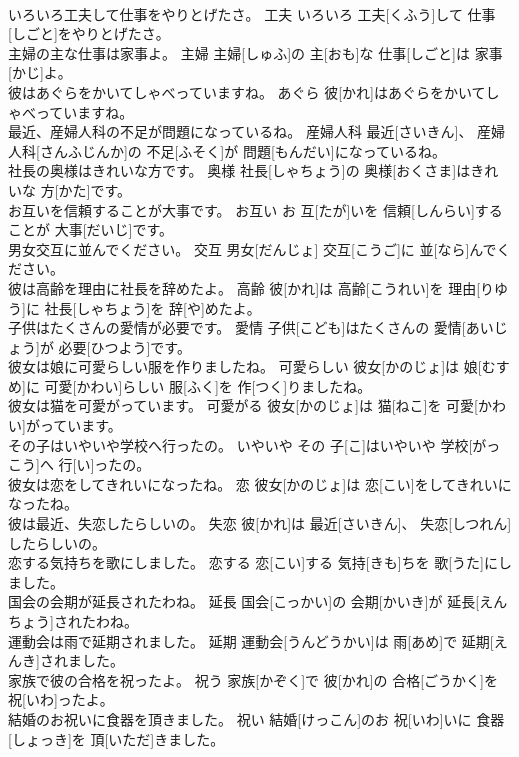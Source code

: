 \documentclass[8pt]{extreport}
\begin{document}
\begin{CJK}{UTF8}{min}
\\	いろいろ工夫して仕事をやりとげたさ。	工夫	いろいろ 工夫[くふう]して 仕事[しごと]をやりとげたさ。	
\\	主婦の主な仕事は家事よ。	主婦	主婦[しゅふ]の 主[おも]な 仕事[しごと]は 家事[かじ]よ。	
\\	彼はあぐらをかいてしゃべっていますね。	あぐら	彼[かれ]はあぐらをかいてしゃべっていますね。	
\\	最近、産婦人科の不足が問題になっているね。	産婦人科	最近[さいきん]、 産婦人科[さんふじんか]の 不足[ふそく]が 問題[もんだい]になっているね。	
\\	社長の奥様はきれいな方です。	奥様	社長[しゃちょう]の 奥様[おくさま]はきれいな 方[かた]です。	
\\	お互いを信頼することが大事です。	お互い	お 互[たが]いを 信頼[しんらい]することが 大事[だいじ]です。	
\\	男女交互に並んでください。	交互	男女[だんじょ] 交互[こうご]に 並[なら]んでください。	
\\	彼は高齢を理由に社長を辞めたよ。	高齢	彼[かれ]は 高齢[こうれい]を 理由[りゆう]に 社長[しゃちょう]を 辞[や]めたよ。	
\\	子供はたくさんの愛情が必要です。	愛情	子供[こども]はたくさんの 愛情[あいじょう]が 必要[ひつよう]です。	
\\	彼女は娘に可愛らしい服を作りましたね。	可愛らしい	彼女[かのじょ]は 娘[むすめ]に 可愛[かわい]らしい 服[ふく]を 作[つく]りましたね。	
\\	彼女は猫を可愛がっています。	可愛がる	彼女[かのじょ]は 猫[ねこ]を 可愛[かわい]がっています。	
\\	その子はいやいや学校へ行ったの。	いやいや	その 子[こ]はいやいや 学校[がっこう]へ 行[い]ったの。	
\\	彼女は恋をしてきれいになったね。	恋	彼女[かのじょ]は 恋[こい]をしてきれいになったね。	
\\	彼は最近、失恋したらしいの。	失恋	彼[かれ]は 最近[さいきん]、 失恋[しつれん]したらしいの。	
\\	恋する気持ちを歌にしました。	恋する	恋[こい]する 気持[きも]ちを 歌[うた]にしました。	
\\	国会の会期が延長されたわね。	延長	国会[こっかい]の 会期[かいき]が 延長[えんちょう]されたわね。	
\\	運動会は雨で延期されました。	延期	運動会[うんどうかい]は 雨[あめ]で 延期[えんき]されました。	
\\	家族で彼の合格を祝ったよ。	祝う	家族[かぞく]で 彼[かれ]の 合格[ごうかく]を 祝[いわ]ったよ。	
\\	結婚のお祝いに食器を頂きました。	祝い	結婚[けっこん]のお 祝[いわ]いに 食器[しょっき]を 頂[いただ]きました。	

\end{CJK}
\end{document}
